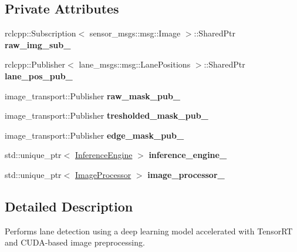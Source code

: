 \subsection*{Private Attributes}
\begin{DoxyCompactItemize}
\item 
\mbox{\label{classMlVisionNode_a8ebe91f1d8bcc201e24e338e9f0c4ba4}} 
rclcpp\+::\+Subscription$<$ sensor\+\_\+msgs\+::msg\+::\+Image $>$\+::Shared\+Ptr {\bfseries raw\+\_\+img\+\_\+sub\+\_\+}
\item 
\mbox{\label{classMlVisionNode_ab2e74b44fff25866be5d3cec30b39952}} 
rclcpp\+::\+Publisher$<$ lane\+\_\+msgs\+::msg\+::\+Lane\+Positions $>$\+::Shared\+Ptr {\bfseries lane\+\_\+pos\+\_\+pub\+\_\+}
\item 
\mbox{\label{classMlVisionNode_a96293498d7a32bacea2df5f43bec8251}} 
image\+\_\+transport\+::\+Publisher {\bfseries raw\+\_\+mask\+\_\+pub\+\_\+}
\item 
\mbox{\label{classMlVisionNode_ae419a723f4e2b5458808a5f0b714df73}} 
image\+\_\+transport\+::\+Publisher {\bfseries tresholded\+\_\+mask\+\_\+pub\+\_\+}
\item 
\mbox{\label{classMlVisionNode_a4d6f6dc34bed19ce55770a7334da690f}} 
image\+\_\+transport\+::\+Publisher {\bfseries edge\+\_\+mask\+\_\+pub\+\_\+}
\item 
\mbox{\label{classMlVisionNode_a6729993d3f3b51aac48f2737d5fdadc5}} 
std\+::unique\+\_\+ptr$<$ \hyperlink{classInferenceEngine}{Inference\+Engine} $>$ {\bfseries inference\+\_\+engine\+\_\+}
\item 
\mbox{\label{classMlVisionNode_aedc401e6a70754ff92bd7a91d2187b80}} 
std\+::unique\+\_\+ptr$<$ \hyperlink{classImageProcessor}{Image\+Processor} $>$ {\bfseries image\+\_\+processor\+\_\+}
\end{DoxyCompactItemize}


\subsection{Detailed Description}
Performs lane detection using a deep learning model accelerated with Tensor\+RT and C\+U\+D\+A-\/based image preprocessing. 

